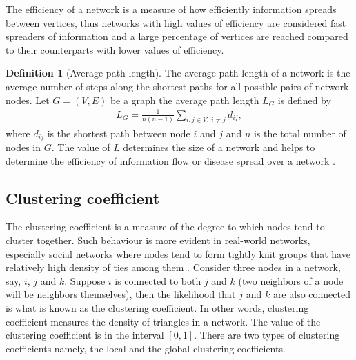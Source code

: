 \documentclass[10pt,a4paper]{article}
\theoremstyle{plain}
\theoremstyle{definition}
\newtheorem{defn}[subsection]{Definition}
\begin{document}
The efficiency of a network is a measure of how efficiently information spreads between vertices, thus networks with high values of efficiency are considered fast spreaders of information and a large percentage of vertices are reached compared to their counterparts with lower values of efficiency.\\

\begin{defn}[Average path length]
	The average path length of a network is the average number of steps along the shortest paths for all possible pairs of network nodes. Let $G = (V , E )$ be a graph the average path length $L_G$ is defined by
	\begin{eqnarray}
	L_G = \frac{1}{n(n-1)} \sum_{i,j \in V,~i \neq j} d_{ij},
	\end{eqnarray}
	where $d_{ij}$ is the shortest path between node $i$ and $j$ and $n$ is the total number of nodes in $G$. The value of $L$ determines the size of a network and helps to determine the efficiency of information flow or disease spread over a network \citep{wang2003complex}.
\end{defn}

\subsection{Clustering coefficient}
The clustering coefficient is a measure of the degree to which nodes tend to cluster together. Such behaviour is more evident in real-world networks, especially social networks where nodes tend to form tightly knit groups that have relatively high density of ties among them \citep{estrada2015first}.
Consider three nodes in a network, say, $i$, $j$ and $k$. Suppose $i$ is connected to both $j$ and $k$ (two neighbors of a node will be neighbors themselves), then the likelihood that $j$ and $k$ are also connected is what is known as the clustering coefficient. In other words, clustering coefficient measures the density of triangles in a  network. 
The value of the clustering coefficient is in the interval $[0,1]$. There are two types of clustering coefficients namely, the local and the global clustering coefficients.\\
\end{document}
